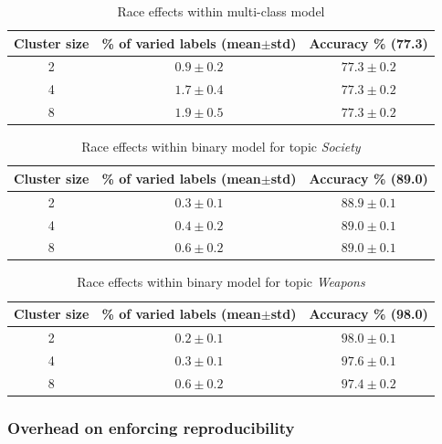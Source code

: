 \begin{table}[htbp]
\caption{Race effects within multi-class model}
\begin{threeparttable}
\begin{tabular}{ccc}
Cluster size    & \% of varied labels (mean$\pm$std) & Accuracy \% (77.3)   \\
\hline
2   &   $0.9\pm0.2$    &   $77.3\pm0.2$    \\
4   &   $1.7\pm0.4$    &   $77.3\pm0.2$    \\
8   &   $1.9\pm0.5$    &   $77.3\pm0.2$    \\
\end{tabular}
\end{threeparttable}
\label{race_table}
\end{table}

\begin{table}[htbp]
\caption{Race effects within binary model for topic {\em Society}}
\begin{threeparttable}
\begin{tabular}{ccc}
Cluster size    & \% of varied labels (mean$\pm$std) & Accuracy \% (89.0)   \\
\hline
2   &   $0.3\pm0.1$    &   $88.9\pm0.1$    \\
4   &   $0.4\pm0.2$    &   $89.0\pm0.1$    \\
8   &   $0.6\pm0.2$    &   $89.0\pm0.1$    \\
\end{tabular}
\end{threeparttable}
\label{race_table_2}
\end{table}

\begin{table}[htbp]
\caption{Race effects within binary model for topic {\em Weapons}}
\begin{threeparttable}
\begin{tabular}{ccc}
Cluster size    & \% of varied labels (mean$\pm$std) & Accuracy \% (98.0)  \\
\hline
2   &   $0.2\pm0.1$    &   $98.0\pm0.1$    \\
4   &   $0.3\pm0.1$    &   $97.6\pm0.1$    \\
8   &   $0.6\pm0.2$    &   $97.4\pm0.2$    \\
\end{tabular}
\end{threeparttable}
\label{race_table_3}
\end{table}

\subsubsection{Overhead on enforcing reproducibility}

